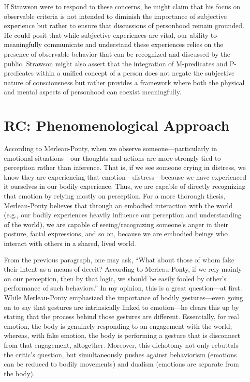 \documentclass[11pt]{article}
\begin{document}
If Strawson were to respond to these concerns, he might claim that his focus on observable criteria is not intended to diminish the importance of subjective experience but rather to ensure that discussions of personhood remain grounded. He could posit that while subjective experiences are vital, our ability to meaningfully communicate and understand these experiences relies on the presence of observable behavior that can be recognized and discussed by the public. Strawson might also assert that the integration of M-predicates and P-predicates within a unified concept of a person does not negate the subjective nature of consciousness but rather provides a framework where both the physical and mental aspects of personhood can coexist meaningfully. 

\section{RC: Phenomenological Approach}

According to Merleau-Ponty, when we observe someone—particularly in emotional situations—our thoughts and actions are more strongly tied to perception rather than inference. That is, if we see someone crying in distress, we know they are experiencing that emotion—distress—because we have experienced it ourselves in our bodily experience. Thus, we are capable of directly recognizing that emotion by relying mostly on perception. For a more thorough thesis, Merleau-Ponty believes that through an embodied interaction with the world (e.g., our bodily experiences heavily influence our perception and understanding of the world), we are capable of seeing/recognizing someone's anger in their posture, facial expressions, and so on, because we are embodied beings who interact with others in a shared, lived world. 

From the previous paragraph, one may ask, ``What about those of whom fake their intent as a means of deceit? According to Merleau-Ponty, if we rely mainly on our perception, then by that logic, we should be easily fooled by other's performance of such behaviors.'' In my opinion, this is a great question—at first. While Merleau-Ponty emphasized the importance of bodily gestures—even going on to say that gestures are intrinsically linked to emotion—he clears this up by stating that the process behind those gestures are different. Essentially, for real emotion, the body is genuinely responding to an engagement with the world; whereas, with fake emotion, the body is performing a gesture that is disconnect from that engagement, altogether. Moreover, this dichotomy not only rebuttals the critic's question, but simultaneously pushes against behaviorism (emotions can be reduced to bodily movements) and dualism (emotions are separate from the body).
\end{document}
